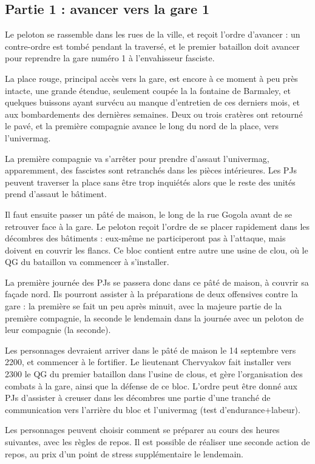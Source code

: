 \documentclass{report}
\begin{document}
\begin{multicols}{2}
\section{Partie 1 : avancer vers la gare 1}
Le peloton se rassemble dans les rues de la ville, et reçoit l'ordre d'avancer : un contre-ordre est tombé pendant la traversé, et le premier bataillon doit avancer pour reprendre la gare numéro 1 à l'envahisseur fasciste.

La place rouge, principal accès vers la gare, est encore à ce moment à peu près intacte, une grande étendue, seulement coupée la la fontaine de Barmaley, et quelques buissons ayant survécu au manque d'entretien de ces derniers mois, et aux bombardements des dernières semaines. Deux ou trois cratères ont retourné le pavé, et la première compagnie avance le long du nord de la place, vers l'univermag.

La première compagnie va s'arrêter pour prendre d'assaut l'univermag, apparemment, des fascistes sont retranchés dans les pièces intérieures. Les PJs peuvent traverser la place sans être trop inquiétés alors que le reste des unités prend d'assaut le bâtiment. 

Il faut ensuite passer un pâté de maison, le long de la rue Gogola avant de se retrouver face à la gare. Le peloton reçoit l'ordre de se placer rapidement dans les décombres des bâtiments : eux-même ne participeront pas à l'attaque, mais doivent en couvrir les flancs. Ce bloc contient entre autre une usine de clou, où le QG du bataillon va commencer à s'installer.

La première journée des PJs se passera donc dans ce pâté de maison, à couvrir sa façade nord. Ils pourront assister à la préparations de deux offensives contre la gare : la première se fait un peu après minuit, avec la majeure partie de la première compagnie, la seconde le lendemain dans la journée avec  un peloton de leur compagnie (la seconde).

Les personnages devraient arriver dans le pâté de maison le 14 septembre vers 2200, et commencer à le fortifier. Le lieutenant Chervyakov fait installer vers 2300 le QG du premier bataillon dans l'usine de clous, et gère l'organisation des combats à la gare, ainsi que la défense de ce bloc. L'ordre peut être donné aux PJs d'assister à creuser dans les décombres une partie d'une tranché de communication vers l'arrière du bloc et l'univermag (test d'endurance+labeur).

Les personnages peuvent choisir comment se préparer au cours des heures suivantes, avec les règles de repos. Il est possible de réaliser une seconde action de repos, au prix d'un point de stress supplémentaire le lendemain.



\end{multicols}
\end{document}
